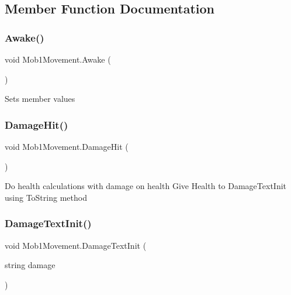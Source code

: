 \subsection{Member Function Documentation}
\mbox{\label{class_mob1_movement_ab5d6209e3082865eb69e197997e7c8f7}} 
\subsubsection{\texorpdfstring{Awake()}{Awake()}}
{\footnotesize\ttfamily void Mob1\+Movement.\+Awake (\begin{DoxyParamCaption}{ }\end{DoxyParamCaption})\hspace{0.3cm}{\ttfamily [private]}}

Sets member values \mbox{\label{class_mob1_movement_a208b9f2f72d057c44055af58371bdfd1}} 
\subsubsection{\texorpdfstring{Damage\+Hit()}{DamageHit()}}
{\footnotesize\ttfamily void Mob1\+Movement.\+Damage\+Hit (\begin{DoxyParamCaption}{ }\end{DoxyParamCaption})\hspace{0.3cm}{\ttfamily [private]}}

Do health calculations with damage on health Give Health to Damage\+Text\+Init using To\+String method \mbox{\label{class_mob1_movement_a8c36ef4e56bc37704d47635c444a07c6}} 
\subsubsection{\texorpdfstring{Damage\+Text\+Init()}{DamageTextInit()}}
{\footnotesize\ttfamily void Mob1\+Movement.\+Damage\+Text\+Init (\begin{DoxyParamCaption}\item[{string}]{damage }\end{DoxyParamCaption})\hspace{0.3cm}{\ttfamily [private]}}


